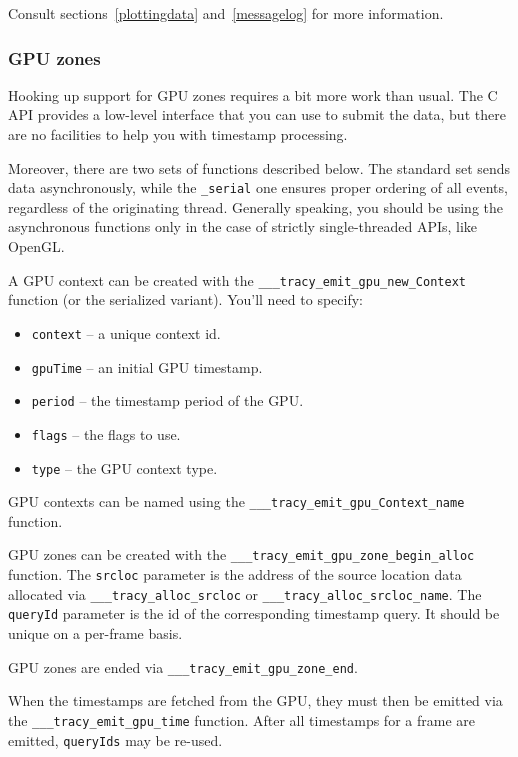 \documentclass[hidelinks,titlepage,a4paper,twoside]{article}
\begin{document}
Consult sections~\ref{plottingdata} and~\ref{messagelog} for more information.

\subsubsection{GPU zones}

Hooking up support for GPU zones requires a bit more work than usual. The C API provides a low-level interface that you can use to submit the data, but there are no facilities to help you with timestamp processing.

Moreover, there are two sets of functions described below. The standard set sends data asynchronously, while the \texttt{\_serial} one ensures proper ordering of all events, regardless of the originating thread. Generally speaking, you should be using the asynchronous functions only in the case of strictly single-threaded APIs, like OpenGL.

A GPU context can be created with the \texttt{\_\_\_tracy\_emit\_gpu\_new\m_Context} function (or the serialized variant). You'll need to specify:

\begin{itemize}
\item \texttt{context} -- a unique context id.
\item \texttt{gpuTime} -- an initial GPU timestamp.
\item \texttt{period} -- the timestamp period of the GPU.
\item \texttt{flags} -- the flags to use.
\item \texttt{type} -- the GPU context type.
\end{itemize}

GPU contexts can be named using the \texttt{\_\_\_tracy\_emit\_gpu\m_Context\_name} function.

GPU zones can be created with the \texttt{\_\_\_tracy\_emit\_gpu\_zone\_begin\_alloc} function. The \texttt{srcloc} parameter is the address of the source location data allocated via \texttt{\_\_\_tracy\_alloc\_srcloc} or \texttt{\_\_\_tracy\_alloc\_srcloc\_name}. The \texttt{queryId} parameter is the id of the corresponding timestamp query. It should be unique on a per-frame basis.

GPU zones are ended via \texttt{\_\_\_tracy\_emit\_gpu\_zone\_end}.

When the timestamps are fetched from the GPU, they must then be emitted via the \texttt{\_\_\_tracy\_emit\_gpu\_time} function. After all timestamps for a frame are emitted, \texttt{queryIds} may be re-used.
\end{document}
